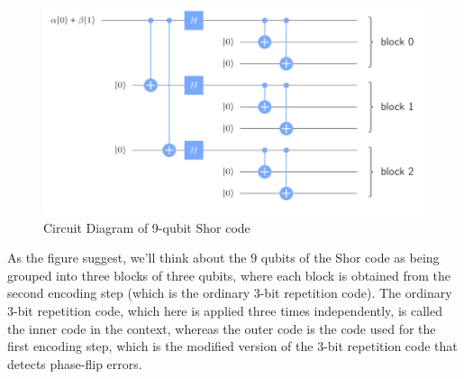 \documentclass[12pt, oneside]{book}
\theoremstyle{definition}
\theoremstyle{definition}
\theoremstyle{remark}
\begin{document}
\begin{figure}[ht]
    \centering
    \includegraphics[width=1\linewidth]{Images/9qubitshorcode.png}
    \caption{Circuit Diagram of 9-qubit Shor code}
    \label{fig:9qubitshorcode}
\end{figure}
As the figure suggest, we'll think about the $9$ qubits of the Shor code as being grouped into three blocks of three qubits, where each block is obtained from the second encoding step (which is the ordinary $3$-bit repetition code). The ordinary $3$-bit repetition code, which here is applied three times independently, is called the inner code in the context, whereas the outer code is the code used for the first encoding step, which is the modified version of the $3$-bit repetition code that detects phase-flip errors.

\backmatter  %
    
    
\end{document}
